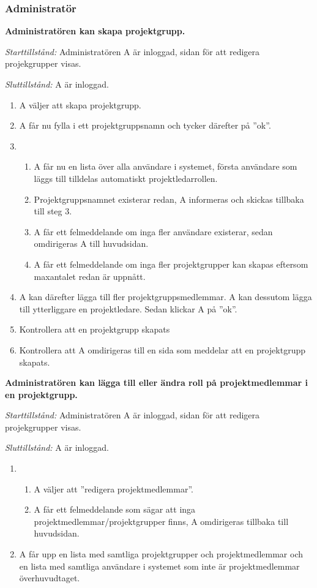 \documentclass[a4paper]{article}
\begin{document}
\subsubsection{Administratör}

\begin{ST}

\item
\textbf{Administratören kan skapa projektgrupp.}

\emph{Starttillstånd:} Administratören A är inloggad, sidan för att redigera projekgrupper visas.

\emph{Sluttillstånd:} A är inloggad.

\begin{enumerate}
\item A väljer att skapa projektgrupp.
\item A får nu fylla i ett projektgruppsnamn och tycker därefter på ''ok''.
\item 
\begin{enumerate}
\item A får nu en lista över alla användare i systemet, första användare som läggs till tilldelas automatiskt projektledarrollen.
\item Projektgruppsnamnet existerar redan, A informeras och skickas tillbaka till steg 3.
\item A får ett felmeddelande om inga fler användare existerar, sedan omdirigeras A till huvudsidan.
\item A får ett felmeddelande om inga fler projektgrupper kan skapas eftersom maxantalet redan är uppnått.
\end{enumerate}
\item A kan därefter lägga till fler projektgruppsmedlemmar. A kan dessutom lägga till ytterliggare en projektledare. Sedan klickar A på ''ok''.
\item Kontrollera att en projektgrupp skapats
\item Kontrollera att A omdirigeras till en sida som meddelar att en projektgrupp skapats.
\end{enumerate}

\item
\textbf{Administratören kan lägga till eller ändra roll på projektmedlemmar i en projektgrupp.}

\emph{Starttillstånd:} Administratören A är inloggad, sidan för att redigera projekgrupper visas.

\emph{Sluttillstånd:} A är inloggad.

\begin{enumerate}
\item 
\begin{enumerate}
\item A väljer att ''redigera projektmedlemmar''.
\item A får ett felmeddelande som sägar att inga projektmedlemmar/projektgrupper finns, A omdirigeras tillbaka till huvudsidan.
\end{enumerate}
\item A får upp en lista med samtliga projektgrupper och projektmedlemmar och en lista med samtliga användare i systemet som inte är projektmedlemmar överhuvudtaget.


\end{enumerate}
\end{ST}
\end{document}
